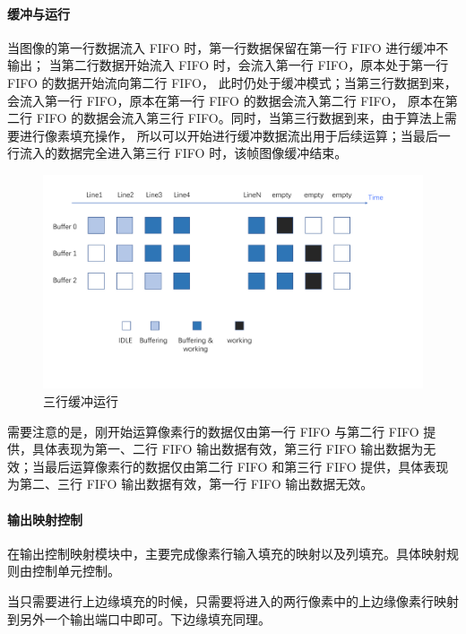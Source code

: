 \documentclass[12pt, a4paper, oneside]{ctexbook}
\begin{document}
	\paragraph{缓冲与运行}
	当图像的第一行数据流入 FIFO 时，第一行数据保留在第一行 FIFO 进行缓冲不输出；
	当第二行数据开始流入 FIFO 时，会流入第一行 FIFO，原本处于第一行 FIFO 的数据开始流向第二行 FIFO，
	此时仍处于缓冲模式；当第三行数据到来，会流入第一行 FIFO，原本在第一行 FIFO 的数据会流入第二行 FIFO，
	原本在第二行 FIFO 的数据会流入第三行 FIFO。同时，当第三行数据到来，由于算法上需要进行像素填充操作，
	所以可以开始进行缓冲数据流出用于后续运算；当最后一行流入的数据完全进入第三行 FIFO 时，该帧图像缓冲结束。
	\begin{figure}[h]
		\centering
		\includegraphics[scale=0.4]{pic/fifo_3_2.pdf}
		\caption{三行缓冲运行}
	\end{figure}
	\par 需要注意的是，刚开始运算像素行的数据仅由第一行 FIFO 与第二行 FIFO 提供，具体表现为第一、二行 FIFO 输出数据有效，第三行 FIFO 输出数据为无效；当最后运算像素行的数据仅由第二行 FIFO 和第三行 FIFO 提供，具体表现为第二、三行 FIFO 输出数据有效，第一行 FIFO 输出数据无效。
	\paragraph{输出映射控制}
	在输出控制映射模块中，主要完成像素行输入填充的映射以及列填充。具体映射规则由控制单元控制。\par 当只需要进行上边缘填充的时候，只需要将进入的两行像素中的上边缘像素行映射到另外一个输出端口中即可。下边缘填充同理。 \\
	
\end{document}
